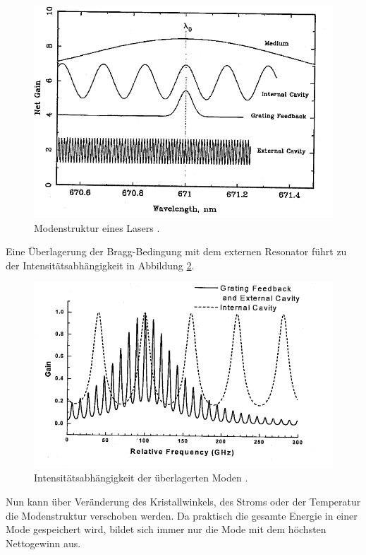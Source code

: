 \begin{figure}[H]
    \centering
    \includegraphics[scale=0.8]{pictures/Moden.png}
    \caption{Modenstruktur eines Lasers \cite{teachspin}.}
    \label{fig:Moden}
\end{figure}
\noindent Eine Überlagerung der Bragg-Bedingung mit dem externen Resonator führt zu der Intensitätsabhängigkeit in Abbildung \ref{fig:Moden1}.
\begin{figure}[H]
    \centering
    \includegraphics[scale=0.8]{pictures/Moden1.png}
    \caption{Intensitätsabhängigkeit der überlagerten Moden \cite{teachspin}.}
    \label{fig:Moden1}
\end{figure}
\noindent Nun kann über Veränderung des Kristallwinkels, des Stroms oder der Temperatur die Modenstruktur verschoben werden.
Da praktisch die gesamte Energie in einer Mode gespeichert wird, bildet sich immer nur die Mode mit dem höchsten Nettogewinn aus. 
